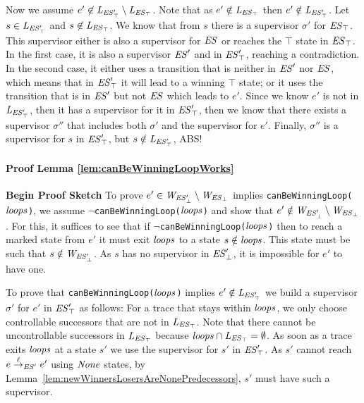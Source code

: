 %

Now we assume $e' \not\in 
\mathit{L_{\mathit{\mathit{ES}'_{\top}}}} \setminus \mathit{L_{\mathit{\mathit{ES}_{\top}}}}$. Note that as $e' \notin \mathit{L_{\mathit{\mathit{ES}_{\top}}}}$ then $e' 
\notin 
\mathit{L_{\mathit{\mathit{ES}'_{\top}}}}$.  
 Let $s \in \mathit{L_{\mathit{\mathit{ES}'_{\top}}}}$ and $s \not\in \mathit{L_{\mathit{\mathit{ES}_{\top}}}}$. We know that from $s$ 
 there is a supervisor $\sigma'$ for 
 $\mathit{\mathit{ES}_{\top}}$. This supervisor either is also a 
 supervisor for $\mathit{ES}$ or reaches the $\top$ state in 
 $\mathit{\mathit{ES}_{\top}}$. In the first case, it is also a 
 supervisor $\mathit{ES}'$ and in $\mathit{\mathit{ES}'_{\top}}$, 
 reaching a contradiction. In the second case, it either uses a 
 transition that is neither in $\mathit{ES}'$ nor $\mathit{ES}$, which 
 means that in $\mathit{\mathit{ES}'_{\top}}$ it will lead to a 
 winning $\top$ state; or it uses the transition that is in 
 $\mathit{ES}'$ but not $\mathit{ES}$ which leads to $e'$. Since we 
 know $e'$ is not in $\mathit{L_{\mathit{\mathit{ES}'_{\top}}}}$, then it has a supervisor for it in 
 $\mathit{\mathit{ES}'_{\top}}$, then we know that there exists a 
 supervisor $\sigma''$ that includes both $\sigma'$ and the 
 supervisor for $e'$. Finally, $\sigma''$ is a supervisor for $s$ in 
 $\mathit{\mathit{ES}'_{\top}}$, but $s \notin \mathit{L_{\mathit{\mathit{ES}'_{\top}}}}$, ABS!	



\paragraph*{Proof Lemma \ref{lem:canBeWinningLoopWorks}}
\textbf{{Begin Proof Sketch}}
To prove $e' \in \mathit{W_{\mathit{\mathit{ES}'_{\bot}}}} \setminus \mathit{W_{\mathit{\mathit{ES}_{\bot}}}}$ implies  \texttt{canBeWinningLoop($\mathit{loops}$)}, we  
assume $\neg$\texttt{canBeWinningLoop($\mathit{loops}$)} and show that $e' \notin \mathit{W_{\mathit{\mathit{ES}'_{\bot}}}} 
\setminus \mathit{W_{\mathit{\mathit{ES}_{\bot}}}}$. For this, it suffices to see that if 
$\neg$\texttt{canBeWinningLoop($\mathit{loops}$)} then to reach a marked state from $e'$ it must 
exit $\mathit{loops}$ to a state $s \notin \mathit{loops}$. This state must be such that $s \notin \mathit{W_{\mathit{\mathit{ES}'_{\bot}}}}$. As 
$s$ has no 
supervisor in $\mathit{\mathit{ES}'_{\bot}}$, it is impossible for $e'$ to have one. 


To prove that \texttt{canBeWinningLoop($\mathit{loops}$)} implies $e' \notin \mathit{L_{\mathit{\mathit{ES}'_{\top}}}}$ we build a supervisor $\sigma'$ for $e'$ in $\mathit{\mathit{ES}'_{\top}}$ as 
follows: 
For a trace that stays within $\mathit{loops}$, we only choose controllable successors 
that are not 
in $\mathit{L_{\mathit{\mathit{ES}_{\top}}}}$. Note that there cannot be uncontrollable successors in $\mathit{L_{\mathit{\mathit{ES}_{\top}}}}$ because 
$\mathit{loops} \cap \mathit{L_{\mathit{\mathit{ES}_{\top}}}}= \emptyset$.   As soon as a trace exits $\mathit{loops}$ at a state $s'$ we 
use the supervisor for $s'$ in $\mathit{\mathit{ES}'_{\top}}$. 
As $s'$ cannot reach $e \overset{\ell}{\rightarrow}_{\mathit{ES}'} 
e'$ using $\mathit{None}$ states, by 
Lemma~\ref{lem:newWinnersLosersAreNonePredecessors}, $s'$ must have such a 
supervisor. 

